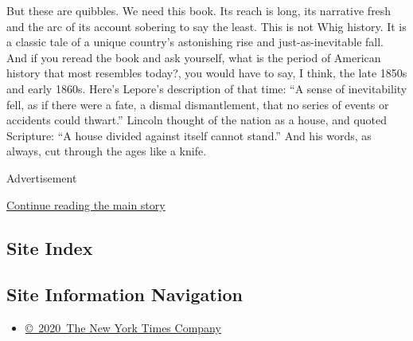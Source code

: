 But these are quibbles. We need this book. Its reach is long, its
narrative fresh and the arc of its account sobering to say the least.
This is not Whig history. It is a classic tale of a unique country's
astonishing rise and just-as-inevitable fall. And if you reread the book
and ask yourself, what is the period of American history that most
resembles today?, you would have to say, I think, the late 1850s and
early 1860s. Here's Lepore's description of that time: ``A sense of
inevitability fell, as if there were a fate, a dismal dismantlement,
that no series of events or accidents could thwart.'' Lincoln thought of
the nation as a house, and quoted Scripture: ``A house divided against
itself cannot stand.'' And his words, as always, cut through the ages
like a knife.

Advertisement

\protect\hyperlink{after-bottom}{Continue reading the main story}

\hypertarget{site-index}{%
\subsection{Site Index}\label{site-index}}

\hypertarget{site-information-navigation}{%
\subsection{Site Information
Navigation}\label{site-information-navigation}}

\begin{itemize}
\tightlist
\item
  \href{https://help.nytimes3xbfgragh.onion/hc/en-us/articles/115014792127-Copyright-notice}{©~2020~The
  New York Times Company}
\end{itemize}

